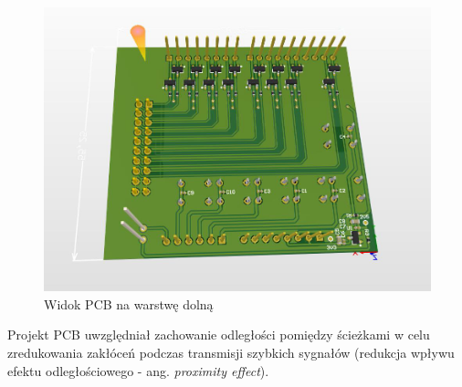 \begin{figure}[H]
\begin{center}
\includegraphics[width=4 in]{images/3D_2.png}
\end{center}
\caption{Widok PCB na warstwę dolną}
\label{fig:PCB_bottom}
\end{figure}

Projekt PCB uwzględniał zachowanie odległości pomiędzy ścieżkami w celu zredukowania zakłóceń podczas transmisji szybkich sygnałów (redukcja wpływu efektu odległościowego - ang. \emph{proximity effect}).